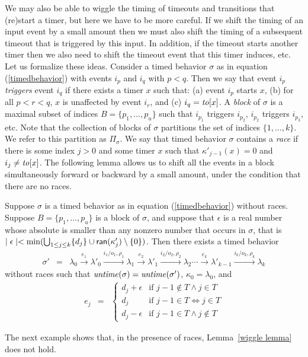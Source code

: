 We may also be able to wiggle the timing of timeouts and transitions that (re)start a timer,
but here we have to be more careful.
If we shift the timing of an input event by a small amount then we must also shift the timing of a subsequent timeout
that is triggered by this input.
In addition, if the timeout starts another timer then we also need to shift the timeout event that this timer induces, etc.
%
Let us formalize these ideas. Consider a timed behavior $\sigma$ as in equation (\ref{timedbehavior})
with events $i_p$ and $i_q$ with $p < q$.
Then we say that event $i_p$ \emph{triggers} event $i_q$ if there exists a timer $x$ such that:
(a) event $i_p$ starts $x$, 
(b) for all $p < r < q$, $x$ is unaffected by event $i_r$, and
(c) $i_q = \mathit{to}[x]$.
A \emph{block} of $\sigma$ is a maximal subset of indices $B = \{ p_1 ,\ldots, p_u \}$ such that $i_{p_1}$ triggers $i_{p_2}$, $i_{p_2}$ triggers $i_{p_3}$, etc.
Note that the collection of blocks of $\sigma$ partitions the set of indices $\{ 1 ,\ldots, k \}$.
We refer to this partition as $\Pi_{\sigma}$.
We say that timed behavior $\sigma$ contains a \emph{race} if there is some index $j>0$ and some timer $x$  
such that $\kappa'_{j-1}(x) = 0$ and $i_j \neq \mathit{to}[x]$.
The following lemma allows us to shift all the events in a block simultaneously forward or backward by a small amount, 
under the condition that there are no races.

\begin{lemma}
\label{wiggle lemma}
Suppose $\sigma$ is a timed behavior as in equation (\ref{timedbehavior}) without races.
Suppose $B = \{ p_1 ,\ldots, p_u \}$ is a block of $\sigma$, and suppose
that $\epsilon$ is a real number whose absolute is smaller than any nonzero number that occurs in $\sigma$, that is
$\mid \epsilon \mid  < \min (\bigcup_{1 \leq j \leq k} \{ d_j \} \cup {\textsf{ran}}(\kappa'_j) \setminus \{ 0 \} )$.
Then there exists a timed behavior
\begin{eqnarray*}
\sigma' & = & \lambda_0 \xrightarrow{e_1} \lambda'_0 \xrightarrow{i_1/o_1, \rho_1} \lambda_1 \xrightarrow{e_2} \lambda'_1 \xrightarrow{i_2/o_2, \rho_2} \lambda_2 \cdots
\xrightarrow{e_k} \lambda'_{k-1} \xrightarrow{i_k/o_k, \rho_k} \lambda_{k}
\end{eqnarray*}
without races such that
$\mathit{untime}(\sigma)=\mathit{untime}(\sigma')$,
$\kappa_0 = \lambda_0$, and
\begin{eqnarray*}
e_j & = & \left\{ \begin{array}{ll}
d_j + \epsilon & \mbox{if } j-1 \not\in T \wedge j \in T \\
d_j & \mbox{if } j-1 \in T \Leftrightarrow j \in T\\
d_j - \epsilon & \mbox{if } j-1 \in T \wedge j \not\in T
\end{array}\right.
\end{eqnarray*}
\end{lemma}
The next example shows that, in the presence of races, Lemma~\ref{wiggle lemma} does not hold. 

